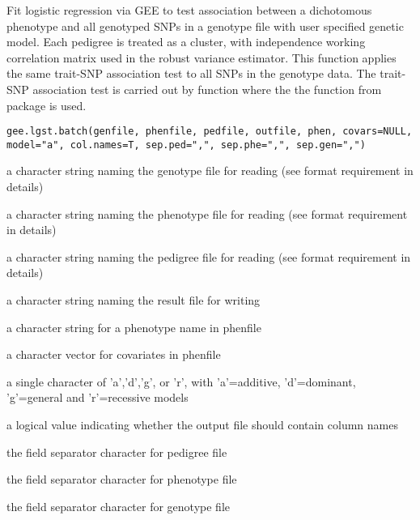 \begin{Description}\relax
Fit logistic regression via GEE to test association between a dichotomous phenotype 
and all genotyped SNPs in a genotype file with user specified genetic model. Each pedigree is treated as 
a cluster, with independence working correlation matrix used in the robust variance estimator.
This function applies the same trait-SNP association test to all SNPs in the genotype data. 
The trait-SNP association test is carried out by  function where the 
the  function from package  is used.
\end{Description}
\begin{Usage}
\begin{verbatim}
gee.lgst.batch(genfile, phenfile, pedfile, outfile, phen, covars=NULL, 
model="a", col.names=T, sep.ped=",", sep.phe=",", sep.gen=",")
\end{verbatim}
\end{Usage}
\begin{Arguments}
\begin{ldescription}
\item[\code{genfile}] a character string naming the genotype file for reading (see format requirement in details) 
\item[\code{phenfile}] a character string naming the phenotype file for reading (see format requirement in details) 
\item[\code{pedfile}] a character string naming the pedigree file for reading (see format requirement in details) 
\item[\code{outfile}] a character string naming the result file for writing 
\item[\code{phen}] a character string for a phenotype name in phenfile 
\item[\code{covars}] a character vector for covariates in phenfile 
\item[\code{model}] a single character of 'a','d','g', or 'r', with 'a'=additive, 'd'=dominant, 'g'=general and 'r'=recessive models 
\item[\code{col.names}] a logical value indicating whether the output file should contain column names 
\item[\code{sep.ped}] the field separator character for pedigree file 
\item[\code{sep.phe}] the field separator character for phenotype file 
\item[\code{sep.gen}] the field separator character for genotype file 
\end{ldescription}
\end{Arguments}

